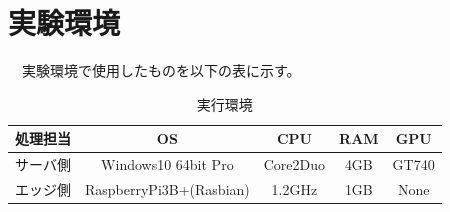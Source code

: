 \section{実験環境}
　実験環境で使用したものを以下の表に示す。
\begin{table}[htb]
\begin{center}
\caption{実行環境}
\begin{tabular}{|c|c|c|c|c|} \hline
処理担当 & OS & CPU & RAM & GPU \\ \hline
サーバ側 & Windows10 64bit Pro & Core2Duo & 4GB & GT740 \\ \hline
エッジ側 & RaspberryPi3B+(Rasbian) & 1.2GHz & 1GB & None \\ \hline
\end{tabular}
\label{spec}
	\end{center}
\end{table}


